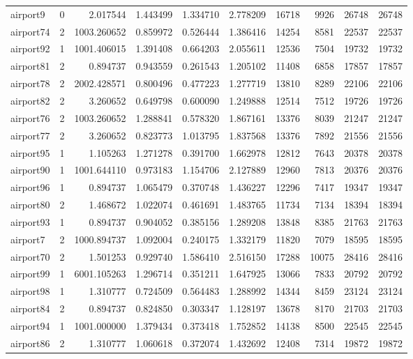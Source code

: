 \begin{longtable}{|l|r|r|r|r|r|r|r|r|r|}
airport9 & 0 & 2.017544 & 1.443499 & 1.334710 & 2.778209 & 16718 & 9926 & 26748 & 26748 \\
airport74 & 2 & 1003.260652 & 0.859972 & 0.526444 & 1.386416 & 14254 & 8581 & 22537 & 22537 \\
airport92 & 1 & 1001.406015 & 1.391408 & 0.664203 & 2.055611 & 12536 & 7504 & 19732 & 19732 \\
airport81 & 2 & 0.894737 & 0.943559 & 0.261543 & 1.205102 & 11408 & 6858 & 17857 & 17857 \\
airport78 & 2 & 2002.428571 & 0.800496 & 0.477223 & 1.277719 & 13810 & 8289 & 22106 & 22106 \\
airport82 & 2 & 3.260652 & 0.649798 & 0.600090 & 1.249888 & 12514 & 7512 & 19726 & 19726 \\
airport76 & 2 & 1003.260652 & 1.288841 & 0.578320 & 1.867161 & 13376 & 8039 & 21247 & 21247 \\
airport77 & 2 & 3.260652 & 0.823773 & 1.013795 & 1.837568 & 13376 & 7892 & 21556 & 21556 \\
airport95 & 1 & 1.105263 & 1.271278 & 0.391700 & 1.662978 & 12812 & 7643 & 20378 & 20378 \\
airport90 & 1 & 1001.644110 & 0.973183 & 1.154706 & 2.127889 & 12960 & 7813 & 20376 & 20376 \\
airport96 & 1 & 0.894737 & 1.065479 & 0.370748 & 1.436227 & 12296 & 7417 & 19347 & 19347 \\
airport80 & 2 & 1.468672 & 1.022074 & 0.461691 & 1.483765 & 11734 & 7134 & 18394 & 18394 \\
airport93 & 1 & 0.894737 & 0.904052 & 0.385156 & 1.289208 & 13848 & 8385 & 21763 & 21763 \\
airport7 & 2 & 1000.894737 & 1.092004 & 0.240175 & 1.332179 & 11820 & 7079 & 18595 & 18595 \\
airport70 & 2 & 1.501253 & 0.929740 & 1.586410 & 2.516150 & 17288 & 10075 & 28416 & 28416 \\
airport99 & 1 & 6001.105263 & 1.296714 & 0.351211 & 1.647925 & 13066 & 7833 & 20792 & 20792 \\
airport98 & 1 & 1.310777 & 0.724509 & 0.564483 & 1.288992 & 14344 & 8459 & 23124 & 23124 \\
airport84 & 2 & 0.894737 & 0.824850 & 0.303347 & 1.128197 & 13678 & 8170 & 21703 & 21703 \\
airport94 & 1 & 1001.000000 & 1.379434 & 0.373418 & 1.752852 & 14138 & 8500 & 22545 & 22545 \\
airport86 & 2 & 1.310777 & 1.060618 & 0.372074 & 1.432692 & 12408 & 7314 & 19872 & 19872 \\

\end{longtable}
